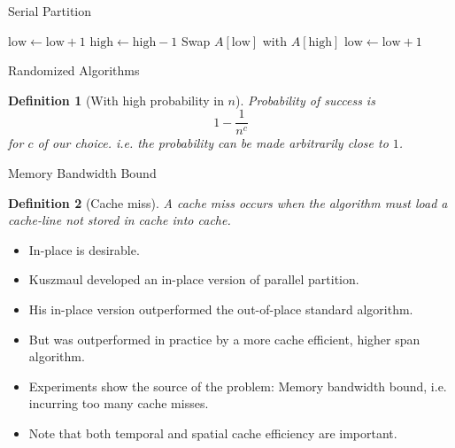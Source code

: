 \documentclass[x11names, svgnames, rgb]{beamer}
\newtheorem{defin}{Definition}
\begin{document}
\begin{frame}[t]{Serial Partition}  %
	\begin{algorithmic}
			\State $\text{low} \gets \text{low}+1$
		\EndWhile
		\State $\text{high} \gets \text{high}-1$
		\EndWhile
		\State Swap $A[\text{low}]$ with $A[\text{high}]$
	\EndWhile
	\State $\text{low} \gets \text{low}+1$
	\EndIf
\end{algorithmic}

\end{frame}

\begin{frame}[t]{Randomized Algorithms}
	\begin{defin}[With high probability in $n$]
		Probability of success is 
		$$1-\frac{1}{n^c}$$
		for $c$ of our choice. i.e. the probability can be made arbitrarily close to $1$.
	\end{defin}
\end{frame}

\begin{frame}[t]{Memory Bandwidth Bound}
	\begin{defin}[Cache miss]
		A cache miss occurs when the algorithm must load a cache-line not stored in cache into cache.
	\end{defin}	
	\begin{itemize}
		\item In-place is desirable.
		\item Kuszmaul developed an in-place version of parallel partition.
		\item His in-place version outperformed the out-of-place standard algorithm.
		\item But was outperformed in practice by a more cache efficient, higher span algorithm.
		\item Experiments show the source of the problem: Memory bandwidth bound, i.e. incurring too many cache misses.
		\item Note that both temporal and spatial cache efficiency are important.
	\end{itemize}
\end{frame}
\end{document}
